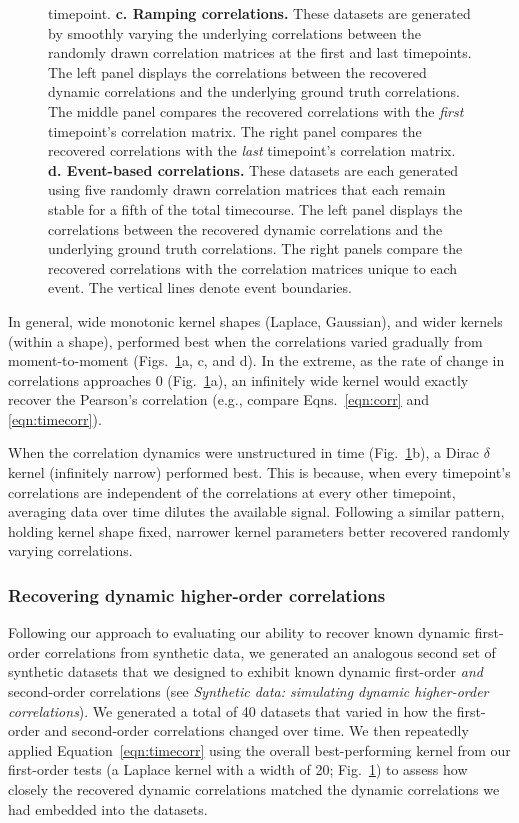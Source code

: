 \documentclass[english]{article}
\begin{document}
\begin{figure}[tp]
{    timepoint.  \textbf{c. Ramping correlations.}  These datasets are
    generated by smoothly varying the underlying correlations between
    the randomly drawn correlation matrices at the first and last
    timepoints.  The left panel displays the correlations between the
    recovered dynamic correlations and the underlying ground truth
    correlations.  The middle panel compares the recovered
    correlations with the \textit{first} timepoint's correlation
    matrix.  The right panel compares the recovered correlations with
    the \textit{last} timepoint's correlation matrix.
    \textbf{d. Event-based correlations.}  These datasets are each
    generated using five randomly drawn correlation matrices that each
    remain stable for a fifth of the total timecourse.  The left panel
    displays the correlations between the recovered dynamic
    correlations and the underlying ground truth correlations.  The
    right panels compare the recovered correlations with the
    correlation matrices unique to each event.  The vertical lines
    denote event boundaries.}
  \label{fig:synthetic}
\end{figure}

In general, wide monotonic kernel shapes (Laplace, Gaussian), and
wider kernels (within a shape), performed best when the correlations
varied gradually from moment-to-moment (Figs.~\ref{fig:synthetic}a, c,
and d).  In the extreme, as the rate of change in correlations
approaches 0 (Fig.~\ref{fig:synthetic}a), an infinitely wide kernel
would exactly recover the Pearson's correlation (e.g., compare
Eqns.~\ref{eqn:corr} and \ref{eqn:timecorr}).

When the correlation dynamics were unstructured in time
(Fig.~\ref{fig:synthetic}b), a Dirac $\delta$ kernel (infinitely
narrow) performed best.  This is because, when every timepoint's
correlations are independent of the correlations at every other
timepoint, averaging data over time dilutes the available signal.
Following a similar pattern, holding kernel shape fixed, narrower
kernel parameters better recovered randomly varying correlations.

\subsubsection*{Recovering dynamic higher-order correlations}
Following our approach to evaluating our ability to recover known
dynamic first-order correlations from synthetic data, we generated an
analogous second set of synthetic datasets that we designed to exhibit
known dynamic first-order \textit{and} second-order correlations (see
\textit{Synthetic data: simulating dynamic higher-order
  correlations}).  We generated a total of 40 datasets that varied in
how the first-order and second-order correlations changed over time.
We then repeatedly applied Equation~\ref{eqn:timecorr} using the
overall best-performing kernel from our first-order tests (a Laplace
kernel with a width of 20; Fig.~\ref{fig:synthetic}) to assess how
closely the recovered dynamic correlations matched the dynamic
correlations we had embedded into the datasets.
\end{document}
